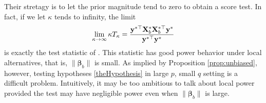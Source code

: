\documentclass[11pt]{article}
\newcommand{\By}{\mathbf{y}}    \newcommand{\Bz}{\mathbf{z}}
\newcommand{\bfsym}[1]{\ensuremath{\boldsymbol{#1}}}
\def\bbeta{\bfsym \beta}
\theoremstyle{plain}
\theoremstyle{definition}
\theoremstyle{remark}
\begin{document}
Their stretagy is to let the prior magnitude tend to zero to obtain a score test.
In fact, if we let $\kappa$ tends to infinity, the limit
\begin{equation*}
    \lim_{\kappa\to \infty} \kappa T_{\kappa} = \frac{\By^{*\top} \BX_b^* \BX_b^{*\top} \By^* }{\By^{*\top} \By^*}
\end{equation*}
is exactly the test statistic of \cite{Goeman2006}.
This statistic has good power behavior under local alternatives, that is, $\|\bbeta_b\|$ is small.
As implied by Proposition \ref{prop:unbiased}, however, testing hypotheses \eqref{theHypothesis} in large $p$, small $q$ setting is a difficult problem.
Intuitively, it may be too ambitious to talk about local power provided the test may have negligible power even when $\|\bbeta_b\|$ is large.
\end{document}
